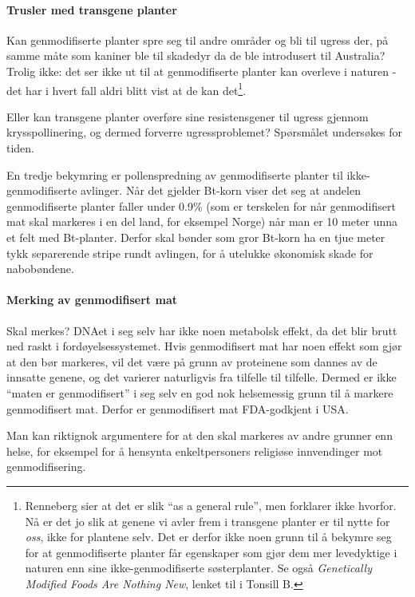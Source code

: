 \paragraph{Trusler med transgene planter} Kan genmodifiserte planter spre seg til andre områder og bli til ugress der, på samme måte som kaniner ble til skadedyr da de ble introdusert til Australia? Trolig ikke: det ser ikke ut til at genmodifiserte planter kan overleve i naturen - det har i hvert fall aldri blitt vist at de kan det\footnote{Renneberg sier at det er slik ``as a general rule'', men forklarer ikke hvorfor. Nå er det jo slik at genene vi avler frem i transgene planter er til nytte for \emph{oss}, ikke for plantene selv. Det er derfor ikke noen grunn til å bekymre seg for at genmodifiserte planter får egenskaper som gjør dem mer levedyktige i naturen enn sine ikke-genmodifiserte søsterplanter. Se også \emph{Genetically Modified Foods Are Nothing New}, lenket til i Tonsill B.}.

Eller kan transgene planter overføre sine resistensgener til ugress gjennom krysspollinering, og dermed forverre ugressproblemet? Spørsmålet undersøkes for tiden.

En tredje bekymring er pollenspredning av genmodifiserte planter til ikke-genmodifiserte avlinger. Når det gjelder Bt-korn viser det seg at andelen genmodifiserte planter faller under 0.9\% (som er terskelen for når genmodifisert mat skal markeres i en del land, for eksempel Norge) når man er 10 meter unna et felt med Bt-planter. Derfor skal bønder som gror Bt-korn ha en tjue meter tykk separerende stripe rundt avlingen, for å utelukke økonomisk skade for nabobøndene.

\paragraph{Merking av genmodifisert mat} Skal  merkes? DNAet i seg selv har ikke noen metabolsk effekt, da det blir brutt ned raskt i fordøyelsessystemet. Hvis genmodifisert mat har noen effekt som gjør at den bør markeres, vil det være på grunn av proteinene som dannes av de innsatte genene, og det varierer naturligvis fra tilfelle til tilfelle. Dermed er ikke ``maten er genmodifisert'' i seg selv en god nok helsemessig grunn til å markere genmodifisert mat. Derfor er genmodifisert mat FDA-godkjent i USA.

Man kan riktignok argumentere for at den skal markeres av andre grunner enn helse, for eksempel for å hensynta enkeltpersoners religiøse innvendinger mot genmodifisering.

